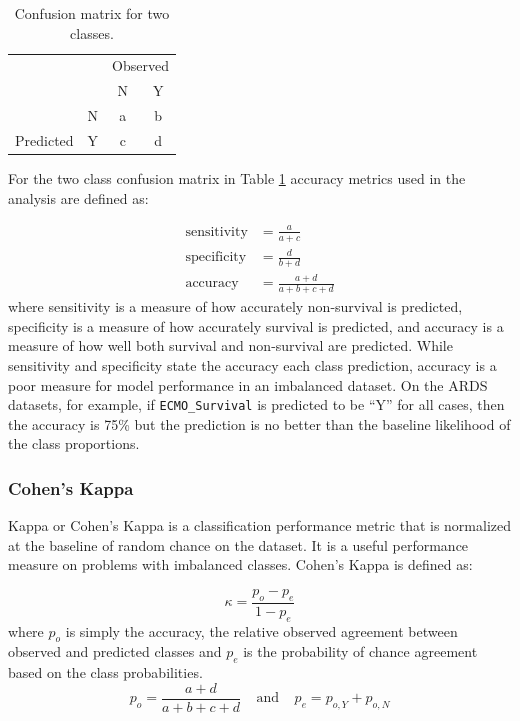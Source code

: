 \documentclass[12pt,]{article}
\begin{document}
\begin{table}[!h]

\caption{\label{tab:unnamed-chunk-1}\label{tab:confusion-matrix} Confusion matrix for two classes.}
\centering
\fontsize{12}{14}\selectfont
\begin{tabular}{lc|cc}
\toprule
\multicolumn{2}{c}{ } & \multicolumn{2}{c}{Observed} \\
\cmidrule(l{3pt}r{3pt}){3-4}
  &   & N & Y\\
\midrule
\rowcolor{gray!6}   & N & a & b\\

\multirow{-2}{*}{\raggedright\arraybackslash Predicted} & Y & c & d\\
\bottomrule
\end{tabular}
\end{table}

For the two class confusion matrix in Table \ref{tab:confusion-matrix}
accuracy metrics used in the analysis are defined as:

\[
\begin{aligned}
\text{sensitivity} &= \frac{a}{a+c} \\
\text{specificity} &= \frac{d}{b+d} \\
\text{accuracy} &= \frac{a+d}{a+b+c+d}
\end{aligned}
\] where sensitivity is a measure of how accurately non-survival is
predicted, specificity is a measure of how accurately survival is
predicted, and accuracy is a measure of how well both survival and
non-survival are predicted. While sensitivity and specificity state the
accuracy each class prediction, accuracy is a poor measure for model
performance in an imbalanced dataset. On the ARDS datasets, for example,
if \texttt{ECMO\_Survival} is predicted to be ``Y'' for all cases, then
the accuracy is 75\% but the prediction is no better than the baseline
likelihood of the class proportions.

\subsubsection{Cohen's Kappa}\label{cohens-kappa}

Kappa or Cohen's Kappa \citep{cohen_coefficient_1960} is a
classification performance metric that is normalized at the baseline of
random chance on the dataset. It is a useful performance measure on
problems with imbalanced classes. Cohen's Kappa is defined as:

\[
\kappa = \frac{p_o - p_e}{1 - p_e}
\] where \(p_o\) is simply the accuracy, the relative observed agreement
between observed and predicted classes and \(p_e\) is the probability of
chance agreement based on the class probabilities. \[
p_o = \frac{a+d}{a+b+c+d}  ~~~~~\text{and}~~~~~ p_e = p_{o,Y} + p_{o,N} 
\]
\end{document}
